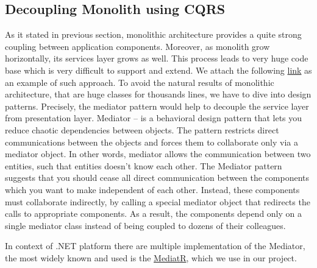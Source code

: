 \subsection{Decoupling Monolith using CQRS}\label{subsec:decoupling-monolith-using-cqrs}
As it stated in previous section, monolithic architecture provides a quite strong coupling between application
components.
Moreover, as monolith grow horizontally, its services layer grows as well.
This process leads to very huge code base which is very difficult to support and extend.
We attach the following
\href{https://github.com/smartstore/SmartStoreNET/blob/4.x/src/Presentation/SmartStore.Web/Controllers/CatalogHelper.cs}
{link}
as an example of such approach.
To avoid the natural results of monolithic architecture, that are huge classes for thousands lines, we have to dive into design patterns.
Precisely, the mediator pattern would help to decouple the service layer from presentation layer.
Mediator -- is a behavioral design pattern that lets you reduce chaotic dependencies between objects.
The pattern restricts direct communications between the objects and forces them to collaborate only via a mediator object.
In other words, mediator allows the communication between two entities, such that entities doesn't know each other.
The Mediator pattern suggests that you should cease all direct communication between the components which you want to make
independent of each other.
Instead, these components must collaborate indirectly, by calling a special mediator object that redirects the calls to
appropriate components.
As a result, the components depend only on a single mediator class instead of being coupled to dozens of their colleagues.

In context of .NET platform there are multiple implementation of the Mediator, the most widely known and used is the
\href{https://github.com/jbogard/MediatR}{MediatR}, which we use in our project.

